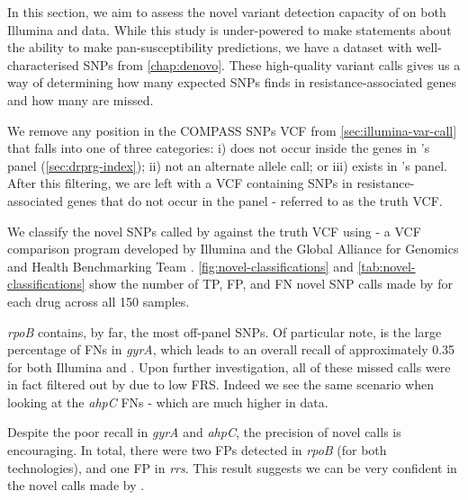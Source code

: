 In this section, we aim to assess the novel variant detection capacity of \drprg{} on both Illumina and \ont{} data. While this study is under-powered to make statements about the ability to make pan-susceptibility predictions, we have a dataset with well-characterised SNPs from \autoref{chap:denovo}. These high-quality variant calls gives us a way of determining how many expected SNPs \drprg{} finds in resistance-associated genes and how many are missed. 

We remove any position in the COMPASS SNPs VCF from \autoref{sec:illumina-var-call} that falls into one of three categories: i) does not occur inside the genes in \drprg{}'s panel (\autoref{sec:drprg-index}); ii) not an alternate allele call; or iii) exists in \drprg{}'s panel. After this filtering, we are left with a VCF containing SNPs in resistance-associated genes that do not occur in the panel - referred to as the truth VCF.

We classify the novel SNPs called by \drprg{} against the truth VCF using  - a VCF comparison program developed by Illumina and the Global Alliance for Genomics and Health Benchmarking Team \cite{happy2019}. \autoref{fig:novel-classifications} and \autoref{tab:novel-classifications} show the number of TP, FP, and FN novel SNP calls made by \drprg{} for each drug across all 150 samples. 

\textit{rpoB} contains, by far, the most off-panel SNPs. Of particular note, is the large percentage of FNs in \textit{gyrA}, which leads to an overall recall of approximately 0.35 for both Illumina and \ont{}. Upon further investigation, all of these missed calls were in fact filtered out by \drprg{} due to low FRS. Indeed we see the same scenario when looking at the \textit{ahpC} FNs - which are much higher in \ont{} data. 

Despite the poor recall in \textit{gyrA} and \textit{ahpC}, the precision of novel \drprg{} calls is encouraging. In total, there were two FPs detected in \textit{rpoB} (for both technologies), and one \ont{} FP in \textit{rrs}. This result suggests we can be very confident in the novel calls made by \drprg{}.


